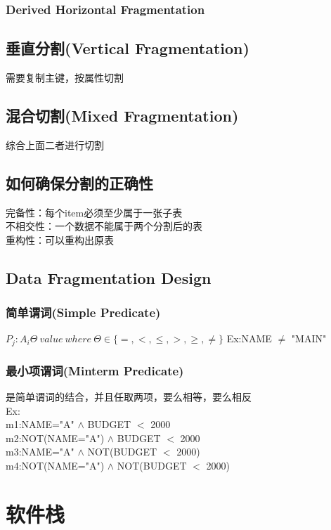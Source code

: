 \documentclass{article}
\begin{document}
\begin{CJK}{UTF8}{gbsn}
	\subsubsection*{Derived Horizontal Fragmentation}
	
	
	\subsection*{垂直分割(Vertical Fragmentation)}
	需要复制主键，按属性切割\\
	\subsection*{混合切割(Mixed Fragmentation)}
	综合上面二者进行切割\\
	\subsection*{如何确保分割的正确性}
	完备性：每个item必须至少属于一张子表\\
	不相交性：一个数据不能属于两个分割后的表\\
	重构性：可以重构出原表\\
	\subsection*{Data Fragmentation Design}
	\subsubsection*{简单谓词(Simple Predicate)}
	$P_j:A_i\Theta\ value\ where\ \Theta\in\lbrace=,<,\leq,>,\geq,\neq \rbrace$
	Ex:NAME $\neq$ "MAIN"\\
	\subsubsection*{最小项谓词(Minterm Predicate)}
	是简单谓词的结合，并且任取两项，要么相等，要么相反\\
	Ex:\\
	m1:NAME="A" $\land$ BUDGET $<$ 2000\\
	m2:NOT(NAME="A") $\land$ BUDGET $<$ 2000\\
	m3:NAME="A" $\land$ NOT(BUDGET $<$ 2000)\\
	m4:NOT(NAME="A") $\land$ NOT(BUDGET $<$ 2000)\\
	
	
	\section*{软件栈}
	

\end{CJK}
\end{document}
